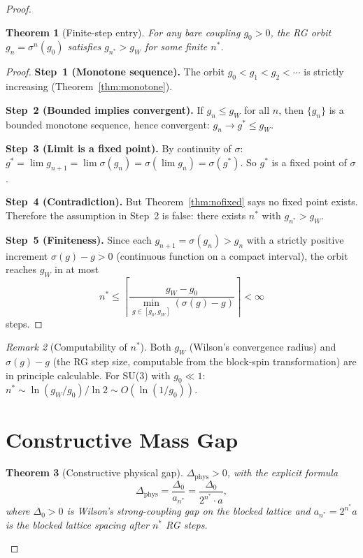 \documentclass[12pt,a4paper]{article}
\theoremstyle{plain}
\newtheorem{theorem}{Theorem}[section]
\theoremstyle{definition}
\theoremstyle{remark}
\newtheorem{remark}[theorem]{Remark}
\begin{document}
\begin{proof}
\begin{theorem}[Finite-step entry]\label{thm:finitestep}
For any bare coupling $g_0>0$, the RG orbit $g_n=\sigma^n(g_0)$ satisfies $g_{n^*}>g_W$ for some finite $n^*$.
\end{theorem}

\begin{proof}
\textbf{Step~1 (Monotone sequence).} The orbit $g_0<g_1<g_2<\cdots$ is strictly increasing (Theorem~\ref{thm:monotone}).

\textbf{Step~2 (Bounded implies convergent).} If $g_n\leq g_W$ for all $n$, then $\{g_n\}$ is a bounded monotone sequence, hence convergent: $g_n\to g^*\leq g_W$.

\textbf{Step~3 (Limit is a fixed point).} By continuity of $\sigma$: $g^*=\lim g_{n+1}=\lim\sigma(g_n)=\sigma(\lim g_n)=\sigma(g^*)$. So $g^*$ is a fixed point of $\sigma$.

\textbf{Step~4 (Contradiction).} But Theorem~\ref{thm:nofixed} says no fixed point exists. Therefore the assumption in Step~2 is false: there exists $n^*$ with $g_{n^*}>g_W$.

\textbf{Step~5 (Finiteness).} Since each $g_{n+1}=\sigma(g_n)>g_n$ with a strictly positive increment $\sigma(g)-g>0$ (continuous function on a compact interval), the orbit reaches $g_W$ in at most
\begin{equation}\label{eq:nstar}
n^* \leq \left\lceil\frac{g_W-g_0}{\min_{g\in[g_0,g_W]}(\sigma(g)-g)}\right\rceil < \infty
\end{equation}
steps.
\end{proof}

\begin{remark}[Computability of $n^*$]
Both $g_W$ (Wilson's convergence radius) and $\sigma(g)-g$ (the RG step size, computable from the block-spin transformation) are in principle calculable. For SU(3) with $g_0\ll 1$: $n^*\sim\ln(g_W/g_0)/\ln 2\sim O(\ln(1/g_0))$.
\end{remark}

\section{Constructive Mass Gap}\label{sec:constructive}

\begin{theorem}[Constructive physical gap]\label{thm:constructive}
$\Delta_{\mathrm{phys}}>0$, with the explicit formula
\begin{equation}\label{eq:gap_explicit}
\Delta_{\mathrm{phys}} = \frac{\Delta_0}{a_{n^*}} = \frac{\Delta_0}{2^{n^*}\cdot a},
\end{equation}
where $\Delta_0>0$ is Wilson's strong-coupling gap on the blocked lattice and $a_{n^*}=2^{n^*}a$ is the blocked lattice spacing after $n^*$ RG steps.
\end{theorem}


\end{proof}
\end{document}

